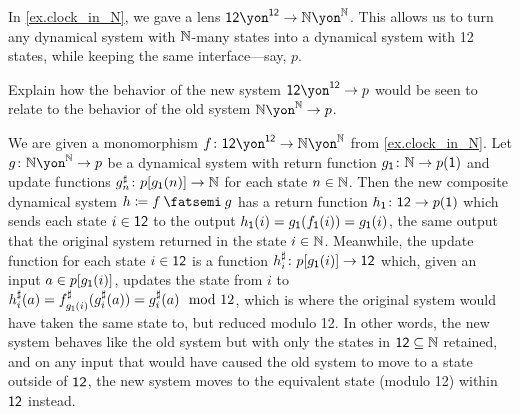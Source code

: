\documentclass[Book-Poly]{subfiles}
\begin{document}
\begin{exercise}
In \cref{ex.clock_in_N}, we gave a lens $\1\2\yon^{\1\2}\to\nn\yon^\nn$. This allows us to turn any dynamical system with $\mathbb{N}$-many states into a dynamical system with 12 states, while keeping the same interface---say, $p$.

Explain how the behavior of the new system $\1\2\yon^{\1\2}\to p$ would be seen to relate to the behavior of the old system $\nn\yon^\nn\to p$.
\begin{solution}
We are given a monomorphism $f \colon \1\2\yon^{\1\2} \to \nn\yon^\nn$ from \cref{ex.clock_in_N}.
Let $g \colon \nn\yon^\nn \to p$ be a dynamical system with return function $g_{\textsf{1}} \colon \mathbb{N} \to p(\textsf{1})$ and update functions $g^\sharp_n \colon p[g_{\textsf{1}}(n)] \to \mathbb{N}$ for each state $n \in \mathbb{N}$.
Then the new composite dynamical system $h \coloneqq f \then g$ has a return function $h_{\textsf{1}} \colon \textsf{1}\textsf{2} \to p(\textsf{1})$ which sends each state $i \in \textsf{1}\textsf{2}$ to the output $h_{\textsf{1}}(i) = g_{\textsf{1}}(f_{\textsf{1}}(i)) = g_{\textsf{1}}(i)$, the same output that the original system returned in the state $i \in \mathbb{N}$.
Meanwhile, the update function for each state $i \in \textsf{1}\textsf{2}$ is a function $h^\sharp_i \colon p[g_{\textsf{1}}(i)] \to \textsf{1}\textsf{2}$ which, given an input $a \in p[g_{\textsf{1}}(i)]$, updates the state from $i$ to $h^\sharp_i(a) = f^\sharp_{g_{\textsf{1}}(i)}(g^\sharp_i(a)) = g^\sharp_i(a) \mod 12$, which is where the original system would have taken the same state to, but reduced modulo 12.
In other words, the new system behaves like the old system but with only the states in $\textsf{1}\textsf{2} \subseteq \mathbb{N}$ retained, and on any input that would have caused the old system to move to a state outside of $\textsf{1}\textsf{2}$, the new system moves to the equivalent state (modulo 12) within $\textsf{1}\textsf{2}$ instead.
\end{solution}
\end{exercise}
\end{document}
